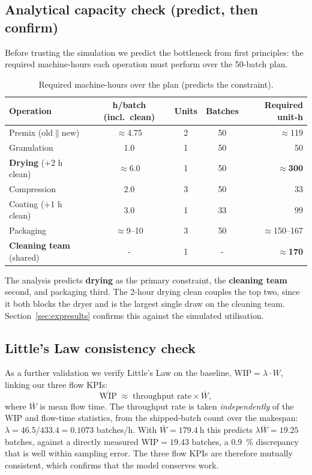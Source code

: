 \subsection{Analytical capacity check (predict, then confirm)}
\label{sec:capacity}
Before trusting the simulation we predict the bottleneck from first principles:
the required machine-hours each operation must perform over the 50-batch plan.

\begin{table}[H]
\centering
\caption{Required machine-hours over the plan (predicts the constraint).}
\label{tab:capacity}
\begin{tabularx}{\textwidth}{l c c c r}
\toprule
Operation & h/batch (incl.\ clean) & Units & Batches & Required unit-h \\
\midrule
Premix (old$\parallel$new)   & $\approx$4.75 & 2 & 50 & $\approx$119 \\
Granulation                  & 1.0  & 1 & 50 & 50 \\
\textbf{Drying} (+2 h clean) & $\approx$6.0 & 1 & 50 & \textbf{$\approx$300} \\
Compression                  & 2.0  & 3 & 50 & 33 \\
Coating (+1 h clean)         & 3.0  & 1 & 33 & 99 \\
Packaging                    & $\approx$9--10 & 3 & 50 & $\approx$150--167 \\
\textbf{Cleaning team} (shared) & - & 1 & - & \textbf{$\approx$170} \\
\bottomrule
\end{tabularx}
\end{table}

The analysis predicts \textbf{drying} as the primary constraint, the
\textbf{cleaning team} second, and packaging third. The 2-hour drying clean
couples the top two, since it both blocks the dryer and is the largest single
draw on the cleaning team. Section~\ref{sec:expresults} confirms this against
the simulated utilisation.

\subsection{Little's Law consistency check}
\label{sec:little}
As a further validation we verify Little's Law on the baseline,
$\text{WIP} = \lambda \cdot W$, linking our three flow KPIs:
\begin{equation}
  \overline{\text{WIP}} \;\approx\; \text{throughput rate} \times \overline{W},
  \label{eq:little}
\end{equation}
where $\overline{W}$ is mean flow time. The throughput rate is taken
\emph{independently} of the WIP and flow-time statistics, from the shipped-batch
count over the makespan: $\lambda = 46.5/433.4 = 0.1073$ batches/h. With
$\overline{W}=\SI{179.4}{\hour}$ this
predicts $\lambda\overline{W}=19.25$ batches, against a directly measured
$\overline{\text{WIP}}=19.43$ batches, a \SI{0.9}{\percent} discrepancy that is
well within sampling error. The three flow KPIs are therefore mutually
consistent, which confirms that the model conserves work.
